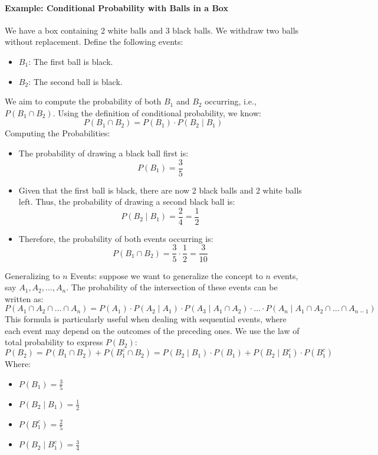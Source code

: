     \paragraph{Example: Conditional Probability with Balls in a Box}
    We have a box containing 2 white balls and 3 black balls. We withdraw two balls without replacement. Define the following events:
    \begin{itemize}
        \item $B_1$: The first ball is black.
        \item $B_2$: The second ball is black.
    \end{itemize}
    We aim to compute the probability of both $B_1$ and $B_2$ occurring, i.e., $P(B_1 \cap B_2)$. Using the definition of conditional probability, we know:
    \[
    P(B_1 \cap B_2) = P(B_1) \cdot P(B_2 \mid B_1)
    \]
    Computing the Probabilities:
    \begin{itemize}
        \item The probability of drawing a black ball first is:
        \[
        P(B_1) = \frac{3}{5}
        \]
        \item Given that the first ball is black, there are now 2 black balls and 2 white balls left. Thus, the probability of drawing a second black ball is:
        \[
        P(B_2 \mid B_1) = \frac{2}{4} = \frac{1}{2}
        \]
        \item Therefore, the probability of both events occurring is:
        \[
        P(B_1 \cap B_2) = \frac{3}{5} \cdot \frac{1}{2} = \frac{3}{10}
        \]
    \end{itemize}
    Generalizing to $n$ Events: suppose we want to generalize the concept to $n$ events, say $A_1, A_2, \dots, A_n$. The probability of the intersection of these events can be written as:
    \[
    P(A_1 \cap A_2 \cap \dots \cap A_n) = P(A_1) \cdot P(A_2 \mid A_1) \cdot P(A_3 \mid A_1 \cap A_2) \cdot \dots \cdot P(A_n \mid A_1 \cap A_2 \cap \dots \cap A_{n-1})
    \]
    This formula is particularly useful when dealing with sequential events, where each event may depend on the outcomes of the preceding ones. \newline
    We use the law of total probability to express $P(B_2)$:
    \[
    P(B_2) = P(B_1\cap B_2) + P(B_1^c \cap B_2) = P(B_2 \mid B_1) \cdot P(B_1) + P(B_2 \mid B_1^c) \cdot P(B_1^c)
    \]
    Where:
    \begin{itemize}
        \item $P(B_1) = \frac{3}{5}$
        \item $P(B_2 \mid B_1) = \frac{1}{2}$
        \item $P(B_1^c) = \frac{2}{5}$
        \item $P(B_2 \mid B_1^c) = \frac{3}{4}$
    \end{itemize}
